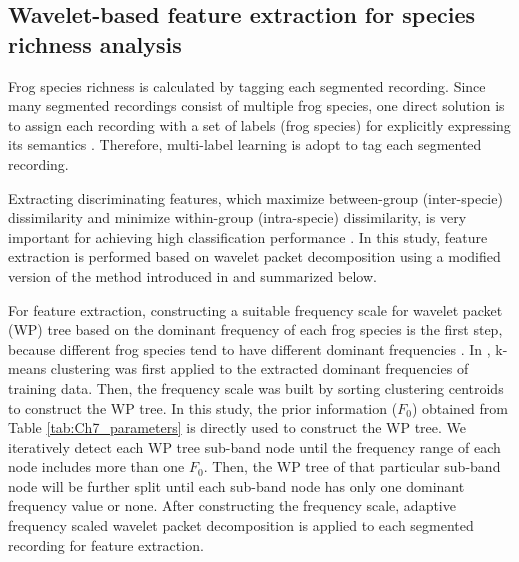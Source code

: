 \subsection{Wavelet-based feature extraction for species richness analysis}
Frog species richness is calculated by tagging each segmented recording. Since many segmented recordings consist of multiple frog species, one direct solution is to assign each recording with a set of labels (frog species) for explicitly expressing its semantics \cite{ZhangReview2014}. Therefore, multi-label learning is adopt to tag each segmented recording. 

Extracting discriminating
features, which maximize between-group (inter-specie) dissimilarity
and minimize within-group (intra-specie) dissimilarity, is very important for achieving high classification performance \cite{huang2009frog, bedoya2014automatic}. In this study, feature extraction is performed based on wavelet packet decomposition using a modified version of the method introduced in \cite{Xie2016} and summarized below. 

For feature extraction, constructing a suitable frequency scale for wavelet packet (WP) tree based on the dominant frequency of each frog species is the first step, because different frog species tend to have different dominant frequencies \cite{Gingras2013}. In \cite{Xie2016}, k-means clustering was first applied to the extracted dominant frequencies of training data. Then, the frequency scale was built by sorting clustering centroids to construct the WP tree. In this study, the prior information ($F_{0}$) obtained from Table \ref{tab:Ch7_parameters} is directly used to construct the WP tree. We iteratively detect each WP tree sub-band node until the frequency range of each node includes more than one $F_{0}$. Then, the WP tree of that particular sub-band node will be further split until each sub-band node has only one dominant frequency value or none. After constructing the frequency scale, adaptive frequency scaled wavelet packet decomposition is applied to each segmented recording for feature extraction. 


